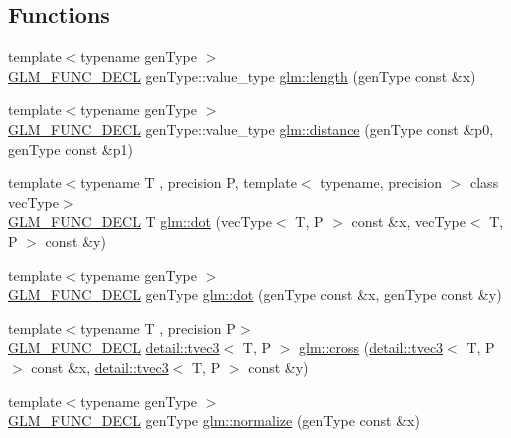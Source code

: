 \subsection*{Functions}
\begin{DoxyCompactItemize}
\item 
{\footnotesize template$<$typename gen\+Type $>$ }\\\hyperlink{setup_8hpp_ab2d052de21a70539923e9bcbf6e83a51}{G\+L\+M\+\_\+\+F\+U\+N\+C\+\_\+\+D\+E\+CL} gen\+Type\+::value\+\_\+type \hyperlink{group__core__func__geometric_ga03b2831439defb8922832b540b91b8a7}{glm\+::length} (gen\+Type const \&x)
\item 
{\footnotesize template$<$typename gen\+Type $>$ }\\\hyperlink{setup_8hpp_ab2d052de21a70539923e9bcbf6e83a51}{G\+L\+M\+\_\+\+F\+U\+N\+C\+\_\+\+D\+E\+CL} gen\+Type\+::value\+\_\+type \hyperlink{group__core__func__geometric_ga00716eae37e8ae2a76ca7799f9c75682}{glm\+::distance} (gen\+Type const \&p0, gen\+Type const \&p1)
\item 
{\footnotesize template$<$typename T , precision P, template$<$ typename, precision $>$ class vec\+Type$>$ }\\\hyperlink{setup_8hpp_ab2d052de21a70539923e9bcbf6e83a51}{G\+L\+M\+\_\+\+F\+U\+N\+C\+\_\+\+D\+E\+CL} T \hyperlink{group__core__func__geometric_ga7dada304da2ba7dd3376ab4f178c3f6b}{glm\+::dot} (vec\+Type$<$ T, P $>$ const \&x, vec\+Type$<$ T, P $>$ const \&y)
\item 
{\footnotesize template$<$typename gen\+Type $>$ }\\\hyperlink{setup_8hpp_ab2d052de21a70539923e9bcbf6e83a51}{G\+L\+M\+\_\+\+F\+U\+N\+C\+\_\+\+D\+E\+CL} gen\+Type \hyperlink{group__core__func__geometric_gaef767c2b0678489cb9de7a534137a86d}{glm\+::dot} (gen\+Type const \&x, gen\+Type const \&y)
\item 
{\footnotesize template$<$typename T , precision P$>$ }\\\hyperlink{setup_8hpp_ab2d052de21a70539923e9bcbf6e83a51}{G\+L\+M\+\_\+\+F\+U\+N\+C\+\_\+\+D\+E\+CL} \hyperlink{structglm_1_1detail_1_1tvec3}{detail\+::tvec3}$<$ T, P $>$ \hyperlink{group__core__func__geometric_ga89b91c2a256cfb62ecbc589d1ee36d3c}{glm\+::cross} (\hyperlink{structglm_1_1detail_1_1tvec3}{detail\+::tvec3}$<$ T, P $>$ const \&x, \hyperlink{structglm_1_1detail_1_1tvec3}{detail\+::tvec3}$<$ T, P $>$ const \&y)
\item 
{\footnotesize template$<$typename gen\+Type $>$ }\\\hyperlink{setup_8hpp_ab2d052de21a70539923e9bcbf6e83a51}{G\+L\+M\+\_\+\+F\+U\+N\+C\+\_\+\+D\+E\+CL} gen\+Type \hyperlink{group__core__func__geometric_ga15aa87101457e41663b08a8dcc3357f8}{glm\+::normalize} (gen\+Type const \&x)

\end{DoxyCompactItemize}
